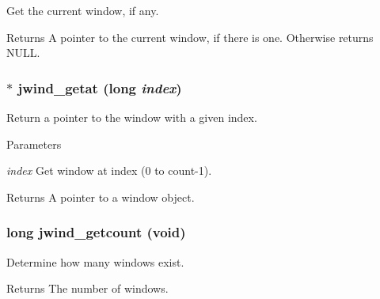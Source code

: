Get the current window, if any. \begin{DoxyReturn}{Returns}
A pointer to the current window, if there is one. Otherwise returns NULL. 
\end{DoxyReturn}
\hypertarget{group__jwind_ga6a7b4f369dfdd3e17e9509cec7bdbb64}{
\subsubsection[{jwind\_\-getat}]{$\ast$ jwind\_\-getat (long {\em index})}}
\label{group__jwind_ga6a7b4f369dfdd3e17e9509cec7bdbb64}


Return a pointer to the window with a given index. 
\begin{DoxyParams}{Parameters}
\item[{\em index}]Get window at index (0 to count-\/1). \end{DoxyParams}
\begin{DoxyReturn}{Returns}
A pointer to a window object. 
\end{DoxyReturn}
\hypertarget{group__jwind_gae627d232548eaefbe00a94ff3c5a1cb6}{
\subsubsection[{jwind\_\-getcount}]{\setlength{\rightskip}{0pt plus 5cm}long jwind\_\-getcount (void)}}
\label{group__jwind_gae627d232548eaefbe00a94ff3c5a1cb6}


Determine how many windows exist. \begin{DoxyReturn}{Returns}
The number of windows. 
\end{DoxyReturn}
